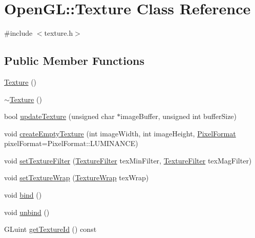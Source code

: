 \hypertarget{class_open_g_l_1_1_texture}{}\section{Open\+GL\+::Texture Class Reference}
\label{class_open_g_l_1_1_texture}


{\ttfamily \#include $<$texture.\+h$>$}

\subsection*{Public Member Functions}
\begin{DoxyCompactItemize}
\item 
\mbox{\hyperlink{class_open_g_l_1_1_texture_a6c275e3f186675ff6ed73ccf970e552f}{Texture}} ()
\item 
\mbox{\hyperlink{class_open_g_l_1_1_texture_a09c4bcb7462f64c1d20fa69dba3cee8a}{$\sim$\+Texture}} ()
\item 
bool \mbox{\hyperlink{class_open_g_l_1_1_texture_ae129740a08ae6255eecd6d399a27c2bd}{update\+Texture}} (unsigned char $\ast$image\+Buffer, unsigned int buffer\+Size)
\item 
void \mbox{\hyperlink{class_open_g_l_1_1_texture_a1d8a63d9862d8149836737b19a2b4c7d}{create\+Empty\+Texture}} (int image\+Width, int image\+Height, \mbox{\hyperlink{namespace_open_g_l_a85472a7a9e32091b8a7ed8dc728d505b}{Pixel\+Format}} pixel\+Format=Pixel\+Format\+::\+L\+U\+M\+I\+N\+A\+N\+CE)
\item 
void \mbox{\hyperlink{class_open_g_l_1_1_texture_a52b73edf08a1621ad18e20afa2b3446a}{set\+Texture\+Filter}} (\mbox{\hyperlink{namespace_open_g_l_a34bc5965567ca64f43e5e38e7cfdb2e4}{Texture\+Filter}} tex\+Min\+Filter, \mbox{\hyperlink{namespace_open_g_l_a34bc5965567ca64f43e5e38e7cfdb2e4}{Texture\+Filter}} tex\+Mag\+Filter)
\item 
void \mbox{\hyperlink{class_open_g_l_1_1_texture_a8078d636e2c0a31812d90f0010dcab7a}{set\+Texture\+Wrap}} (\mbox{\hyperlink{namespace_open_g_l_a22eb6a3df5ed600fb89f2baf8d1c8027}{Texture\+Wrap}} tex\+Wrap)
\item 
void \mbox{\hyperlink{class_open_g_l_1_1_texture_a5ea786e618849c76825597fe53af8990}{bind}} ()
\item 
void \mbox{\hyperlink{class_open_g_l_1_1_texture_a762d9b99b7eb49845da1e37009d1fe5d}{unbind}} ()
\item 
G\+Luint \mbox{\hyperlink{class_open_g_l_1_1_texture_a23a849a67d8608d3af93b969ab6320c7}{get\+Texture\+Id}} () const

\end{DoxyCompactItemize}
